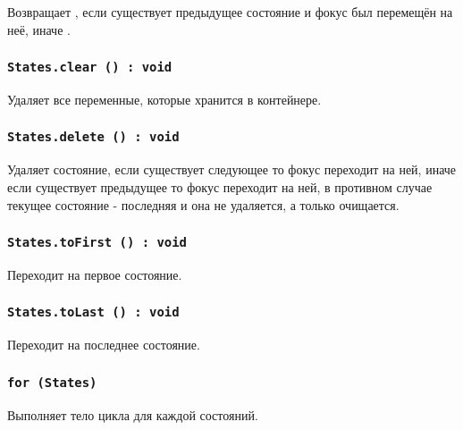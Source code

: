 Возвращает \true, если существует предыдущее состояние и фокус был перемещён на неё, иначе \false.

\subsubsection{\texttt{States.clear () : void}}

Удаляет все переменные, которые хранится в контейнере.

\subsubsection{\texttt{States.delete () : void}}

Удаляет состояние, если существует следующее то фокус переходит на ней, иначе если существует предыдущее то фокус переходит на ней, в противном случае текущее состояние - последняя и она не удаляется, а только очищается.

\subsubsection{\texttt{States.toFirst () : void}}

Переходит на первое состояние.

\subsubsection{\texttt{States.toLast () : void}}

Переходит на последнее состояние.

\subsubsection{\texttt{for (States) {}}}

Выполняет тело цикла для каждой состояний.

